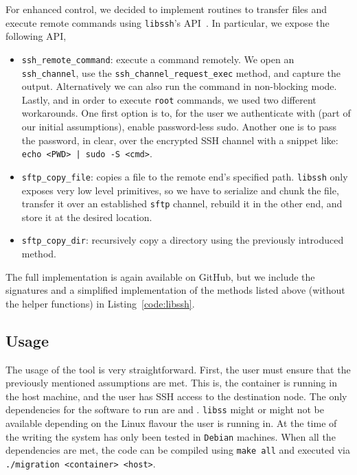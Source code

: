 For enhanced control, we decided to implement routines to transfer files and execute remote commands using \texttt{libssh}'s API~\cite{libssh,libssh-api}.
In particular, we expose the following API,
\begin{itemize}
    \item \texttt{ssh\_remote\_command}: execute a command remotely. We open an \texttt{ssh\_channel}, use the \texttt{ssh\_channel\_request\_exec} method, and capture the output. Alternatively we can also run the command in non-blocking mode. Lastly, and in order to execute \texttt{root} commands, we used two different workarounds. One first option is to, for the user we authenticate with (part of our initial assumptions), enable password-less sudo. Another one is to pass the password, in clear, over the encrypted SSH channel with a snippet like: \texttt{echo <PWD> | sudo -S <cmd>}.
    \item \texttt{sftp\_copy\_file}: copies a file to the remote end's specified path. \texttt{libssh} only exposes very low level primitives, so we have to serialize and chunk the file, transfer it over an established \texttt{sftp} channel, rebuild it in the other end, and store it at the desired location.
    \item \texttt{sftp\_copy\_dir}: recursively copy a directory using the previously introduced method.
\end{itemize}
The full implementation is again available on GitHub, but we include the signatures and a simplified implementation of the methods listed above (without the helper functions) in Listing~\ref{code:libssh}.

\subsection{Usage}

The usage of the tool is very straightforward.
First, the user must ensure that the previously mentioned assumptions are met.
This is, the container is running in the host machine, and the user has SSH access to the destination node.
The only dependencies for the software to run are \criu and \runc.
\texttt{libss} might or might not be available depending on the Linux flavour the user is running in.
At the time of the writing the system has only been tested in \texttt{Debian} machines.
When all the dependencies are met, the code can be compiled using \texttt{make all} and executed via \texttt{./migration <container> <host>}.
